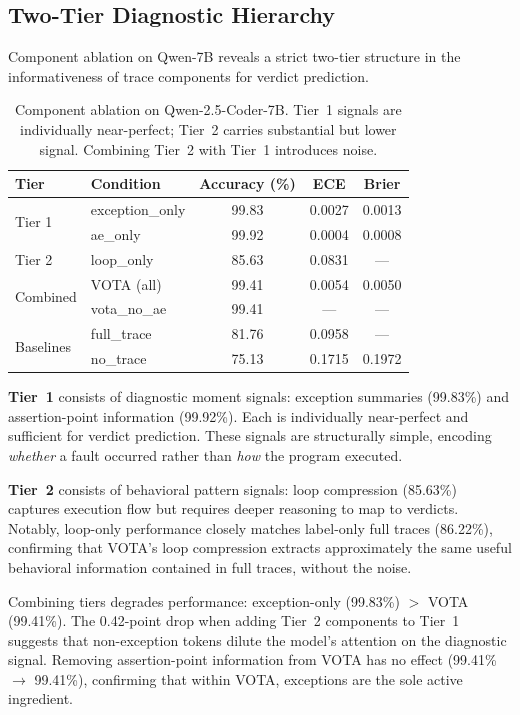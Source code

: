 \documentclass[11pt]{article}
\begin{document}
\subsection{Two-Tier Diagnostic Hierarchy}
\label{sec:hierarchy}

Component ablation on Qwen-7B reveals a strict two-tier structure in the informativeness of trace components for verdict prediction.

\begin{table}[t]
\centering
\caption{Component ablation on Qwen-2.5-Coder-7B. Tier~1 signals are individually near-perfect; Tier~2 carries substantial but lower signal. Combining Tier~2 with Tier~1 introduces noise.}
\label{tab:ablation}
\small
\begin{tabular}{llccc}
\toprule
\textbf{Tier} & \textbf{Condition} & \textbf{Accuracy (\%)} & \textbf{ECE} & \textbf{Brier} \\
\midrule
\multirow{2}{*}{Tier 1} & exception\_only & 99.83 & 0.0027 & 0.0013 \\
 & ae\_only & 99.92 & 0.0004 & 0.0008 \\
\midrule
Tier 2 & loop\_only & 85.63 & 0.0831 & --- \\
\midrule
\multirow{2}{*}{Combined} & VOTA (all) & 99.41 & 0.0054 & 0.0050 \\
 & vota\_no\_ae & 99.41 & --- & --- \\
\midrule
\multirow{2}{*}{Baselines} & full\_trace & 81.76 & 0.0958 & --- \\
 & no\_trace & 75.13 & 0.1715 & 0.1972 \\
\bottomrule
\end{tabular}
\end{table}

\textbf{Tier~1} consists of diagnostic moment signals: exception summaries (99.83\%) and assertion-point information (99.92\%). Each is individually near-perfect and sufficient for verdict prediction. These signals are structurally simple, encoding \emph{whether} a fault occurred rather than \emph{how} the program executed.

\textbf{Tier~2} consists of behavioral pattern signals: loop compression (85.63\%) captures execution flow but requires deeper reasoning to map to verdicts. Notably, loop-only performance closely matches label-only full traces (86.22\%), confirming that VOTA's loop compression extracts approximately the same useful behavioral information contained in full traces, without the noise.

Combining tiers degrades performance: exception-only (99.83\%) $>$ VOTA (99.41\%). The 0.42-point drop when adding Tier~2 components to Tier~1 suggests that non-exception tokens dilute the model's attention on the diagnostic signal. Removing assertion-point information from VOTA has no effect (99.41\% $\to$ 99.41\%), confirming that within VOTA, exceptions are the sole active ingredient.
\end{document}
